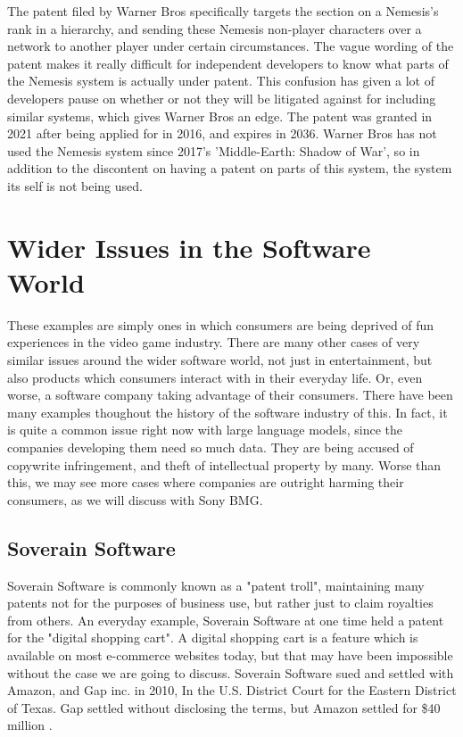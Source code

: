 \documentclass[12pt,letterpaper]{article}
\begin{document}
The patent \cite{wb} filed by Warner Bros specifically targets the section on a Nemesis's rank in a hierarchy, and sending these Nemesis non-player characters over a network to another player under certain circumstances. The vague wording of the patent makes it really difficult for independent developers to know what parts of the Nemesis system is actually under patent.
This confusion has given a lot of developers pause on whether or not they will be litigated against for including similar systems, which gives Warner Bros an edge. The patent was granted in 2021 after being applied for in 2016, and expires in 2036. Warner Bros has not used the Nemesis system since 2017's 'Middle-Earth: Shadow of War', so in addition to the discontent on having a patent on parts of this system, the system its self is not being used.

\section{Wider Issues in the Software World}
These examples are simply ones in which consumers are being deprived of fun experiences in the video game industry. There are many other cases of very similar issues around the wider software world, not just in entertainment, but also products which consumers interact with in their everyday life. Or, even worse, a software company taking advantage of their consumers. There have been many examples thoughout the history of the software industry of this. In fact, it is quite a common issue right now with large language models, since the companies developing them need so much data. They are being accused of copywrite infringement, and theft of intellectual property by many. Worse than this, we may see more cases where companies are outright harming their consumers, as we will discuss with Sony BMG.

\subsection{Soverain Software}
Soverain Software is commonly known as a "patent troll", maintaining many patents not for the purposes of business use, but rather just to claim royalties from others. An everyday example, Soverain Software at one time held a patent for the "digital shopping cart". A digital shopping cart is a feature which is available on most e-commerce websites today, but that may have been impossible without the case we are going to discuss. Soverain Software sued and settled with Amazon, and Gap inc. in 2010, In the U.S. District Court for the Eastern District of Texas. Gap settled without disclosing the terms, but Amazon settled for \$40 million \cite{Soverain}.
\end{document}
